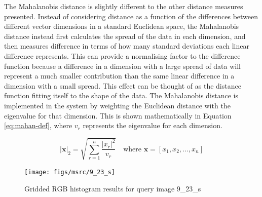 \begin{appendices}
The Mahalanobis distance is slightly different to the other distance measures presented. Instead of considering distance as a function of the differences between different vector dimensions in a standard Euclidean space, the Mahalanobis distance instead first calculates the spread of the data in each dimension, and then measures difference in terms of how many standard deviations each linear difference represents. This can provide a normalising factor to the difference function because a difference in a dimension with a large spread of data will represent a much smaller contribution than the same linear difference in a dimension with a small spread. This effect can be thought of as the distance function fitting itself to the shape of the data. The Mahalanobis distance is implemented in the system by weighting the Euclidean distance with the eigenvalue for that dimension. This is shown mathematically in Equation \ref{eq:mahan-def}, where $v_r$ represents the eigenvalue for each dimension.

\begin{equation}
|\mathbf{x}|_2 = \sqrt{\sum_{r=1}^{n} \frac{|x_r|^2}{v_r} } \quad \text{where } \mathbf{x} = [ x_1 , x_2, ... , x_n] \label{eq:mahan-def}
\end{equation}

\begin{figure}[ht]
	\begin{minipage}[]{0.3\linewidth}
		\centering
		\texttt{[image: figs/msrc/9\_23\_s]}
	\end{minipage}
	\begin{minipage}[]{0.7\linewidth}
		\centering
	\end{minipage}
	\caption{Gridded RGB histogram results for query image 9\_23\_s}
	\label{fig:dist-meas-sheep}
\end{figure}


\end{appendices}
